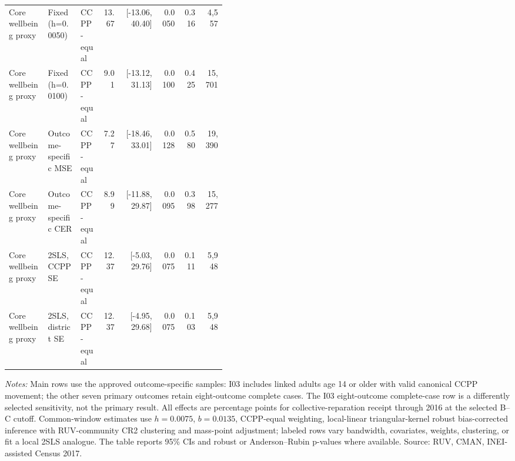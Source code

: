 \begin{longtable}{p{0.18\linewidth}p{0.15\linewidth}p{0.10\linewidth}rrrrr}
Core wellbeing proxy & Fixed (h=0.0050) & CCPP-equal & 13.67 & [-13.06, 40.40] & 0.0050 & 0.316 & 4,557 \\
Core wellbeing proxy & Fixed (h=0.0100) & CCPP-equal & 9.01 & [-13.12, 31.13] & 0.0100 & 0.425 & 15,701 \\
Core wellbeing proxy & Outcome-specific MSE & CCPP-equal & 7.27 & [-18.46, 33.01] & 0.0128 & 0.580 & 19,390 \\
Core wellbeing proxy & Outcome-specific CER & CCPP-equal & 8.99 & [-11.88, 29.87] & 0.0095 & 0.398 & 15,277 \\
Core wellbeing proxy & 2SLS, CCPP SE & CCPP-equal & 12.37 & [-5.03, 29.76] & 0.0075 & 0.111 & 5,948 \\
Core wellbeing proxy & 2SLS, district SE & CCPP-equal & 12.37 & [-4.95, 29.68] & 0.0075 & 0.103 & 5,948 \\
\bottomrule
\end{longtable}
\begin{minipage}{0.98\linewidth}\footnotesize\textit{Notes:} Main rows use the approved outcome-specific samples: I03 includes linked adults age 14 or older with valid canonical CCPP movement; the other seven primary outcomes retain eight-outcome complete cases. The I03 eight-outcome complete-case row is a differently selected sensitivity, not the primary result. All effects are percentage points for collective-reparation receipt through 2016 at the selected B--C cutoff. Common-window estimates use \(h=0.0075\), \(b=0.0135\), CCPP-equal weighting, local-linear triangular-kernel robust bias-corrected inference with RUV-community CR2 clustering and mass-point adjustment; labeled rows vary bandwidth, covariates, weights, clustering, or fit a local 2SLS analogue. The table reports 95\% CIs and robust or Anderson--Rubin p-values where available. Source: RUV, CMAN, INEI-assisted Census 2017.\end{minipage}
\endgroup
